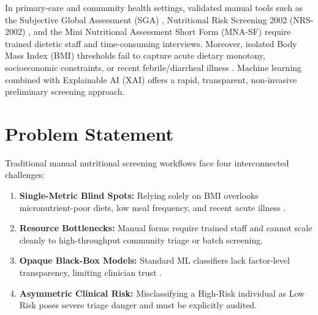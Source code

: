 \documentclass[12pt,a4paper]{report}
\begin{document}
In primary-care and community health settings, validated manual tools such as the Subjective Global Assessment (SGA) \cite{detsky1987what}, Nutritional Risk Screening 2002 (NRS-2002) \cite{kondrup2003espen}, and the Mini Nutritional Assessment Short Form (MNA-SF) \cite{rubenstein2001screening} require trained dietetic staff and time-consuming interviews. Moreover, isolated Body Mass Index (BMI) thresholds fail to capture acute dietary monotony, socioeconomic constraints, or recent febrile/diarrheal illness \cite{who2000obesity}. Machine learning combined with Explainable AI (XAI) offers a rapid, transparent, non-invasive preliminary screening approach.

\section{Problem Statement}
Traditional manual nutritional screening workflows face four interconnected challenges:
\begin{enumerate}
    \item \textbf{Single-Metric Blind Spots:} Relying solely on BMI overlooks micronutrient-poor diets, low meal frequency, and recent acute illness \cite{who2000obesity, fao2016mddw}.
    \item \textbf{Resource Bottlenecks:} Manual forms require trained staff and cannot scale cleanly to high-throughput community triage or batch screening.
    \item \textbf{Opaque Black-Box Models:} Standard ML classifiers lack factor-level transparency, limiting clinician trust \cite{topol2019high, amann2020explainability}.
    \item \textbf{Asymmetric Clinical Risk:} Misclassifying a High-Risk individual as Low Risk poses severe triage danger and must be explicitly audited.
\end{enumerate}
\end{document}
